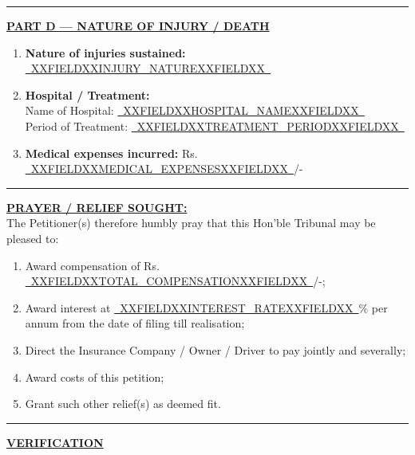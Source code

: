 \documentclass[12pt,a4paper]{article}
\newcommand{\fillline}[1]{\underline{~#1~}}
\begin{document}
\vspace{1em}
\rule{\linewidth}{0.4pt}

\noindent\textbf{\uline{PART D --- NATURE OF INJURY / DEATH}}

\vspace{0.5em}

\begin{enumerate}[label=\textbf{\arabic*.}, leftmargin=2em, itemsep=0.6em, start=13]

    \item \textbf{Nature of injuries sustained:} \fillline{XXFIELDXXINJURY_NATUREXXFIELDXX}

    \item \textbf{Hospital / Treatment:}\\
          Name of Hospital: \fillline{XXFIELDXXHOSPITAL_NAMEXXFIELDXX}\\
          Period of Treatment: \fillline{XXFIELDXXTREATMENT_PERIODXXFIELDXX}

    \item \textbf{Medical expenses incurred:} Rs. \fillline{XXFIELDXXMEDICAL_EXPENSESXXFIELDXX}/-

\end{enumerate}

\vspace{1em}
\rule{\linewidth}{0.4pt}

\noindent\textbf{\uline{PRAYER / RELIEF SOUGHT:}}\\
The Petitioner(s) therefore humbly pray that this Hon'ble Tribunal may be
pleased to:
\begin{enumerate}[label=(\alph*)]
    \item Award compensation of Rs. \fillline{XXFIELDXXTOTAL_COMPENSATIONXXFIELDXX}/-;
    \item Award interest at \fillline{XXFIELDXXINTEREST_RATEXXFIELDXX}\% per annum from the date
          of filing till realisation;
    \item Direct the Insurance Company / Owner / Driver to pay jointly and severally;
    \item Award costs of this petition;
    \item Grant such other relief(s) as deemed fit.
\end{enumerate}

\vspace{1em}
\rule{\linewidth}{0.4pt}

\begin{center}
    \textbf{\uline{VERIFICATION}}
\end{center}
\end{document}
